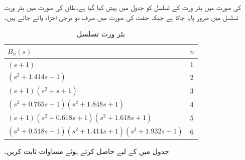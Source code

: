  کی صورت میں بٹر ورت کے تسلسل کو جدول  میں پیش کیا گیا ہے۔طاق  کی صورت میں بٹر ورت تسلسل میں  ضرور پایا جاتا ہے جبکہ جفت  کی صورت میں صرف  دو درجی اجزاء پائے جاتے ہیں۔
 
\begin{table}
\caption{بٹر ورت تسلسل}
\label{جدول_تعددی_ردعمل_بٹرورت_قلیات}
\centering
\begin{tabular}{l l}
\toprule
$B_n(s)$&$n$\\
\midrule
$\left(s+1 \right) $ &1\\
$ \left(s^2+1.414s+1 \right)$&2\\
$\left(s+1\right)\left(s^2+s+1 \right)$ &3\\
$\left(s^2+0.765s+1\right)\left(s^2+1.848s+1\right)$&4\\
$\left(s+1\right)\left(s^2+0.618s+1\right)\left(s^2+1.618s+1\right)$&5\\
$\left(s^2+0.518s+1 \right)\left(s^2+1.414s+1\right)\left(s^2+1.932s+1\right)$&6\\
\bottomrule
\end{tabular}
\end{table}
%
جدول  میں  کے لیے  حاصل کرتے ہوئے مساوات  ثابت کریں۔

